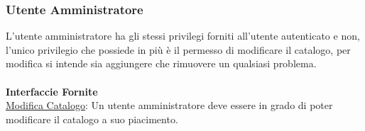 \documentclass[11pt, a4paper]{article}
\theoremstyle{definition} %
\begin{document}

\subsubsection{Utente Amministratore}
L'utente amministratore ha gli stessi privilegi forniti all'utente autenticato e non, l'unico privilegio che possiede in più è il permesso di modificare il catalogo,
per modifica si intende sia aggiungere che rimuovere un qualsiasi problema.
\\\\\textbf{Interfaccie Fornite}\\
\underline{Modifica Catalogo}: Un utente amministratore deve essere in grado di poter modificare il catalogo a suo piacimento.
\end{document}
